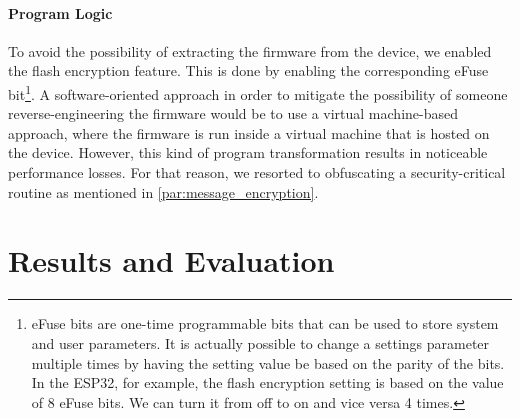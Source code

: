 \documentclass[conference]{IEEEtran}
\begin{document}
\paragraph{Program Logic}


To avoid the possibility of extracting the firmware from the device,
we enabled the flash encryption feature. This is done by enabling the
corresponding eFuse bit\footnote{eFuse bits are one-time programmable bits that
can be used to store system and user parameters. 
It is actually possible to change a settings parameter multiple times by having the setting 
value be based on the parity of the  bits. In the ESP32, for example, the flash encryption setting 
is based on the value of 8 eFuse bits. We can turn it from off to on and vice versa 4 times.
}. A software-oriented approach in order to mitigate the possibility of someone reverse-engineering the firmware would be to use
a virtual machine-based approach,
where the firmware is run inside a virtual machine that is hosted on the device.
However, this kind of program transformation results in noticeable performance losses.
For that reason, we resorted to obfuscating a security-critical routine as mentioned in \cref{par:message_encryption}.

\section{Results and Evaluation}
\end{document}

